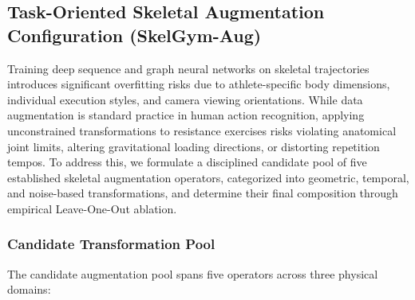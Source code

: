 \documentclass[preprint,12pt]{elsarticle}
\begin{document}
\subsection{Task-Oriented Skeletal Augmentation Configuration (SkelGym-Aug)}
Training deep sequence and graph neural networks on skeletal trajectories introduces significant overfitting risks due to athlete-specific body dimensions, individual execution styles, and camera viewing orientations. While data augmentation is standard practice in human action recognition, applying unconstrained transformations to resistance exercises risks violating anatomical joint limits, altering gravitational loading directions, or distorting repetition tempos. To address this, we formulate a disciplined candidate pool of five established skeletal augmentation operators, categorized into geometric, temporal, and noise-based transformations, and determine their final composition through empirical Leave-One-Out ablation.

\subsubsection{Candidate Transformation Pool}
The candidate augmentation pool spans five operators across three physical domains:
\end{document}
